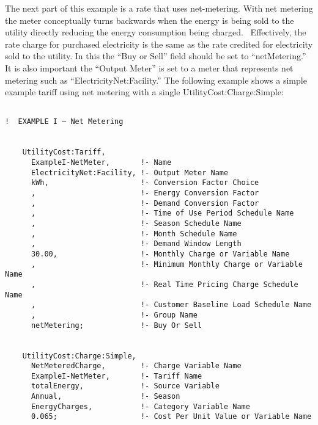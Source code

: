 The next part of this example is a rate that uses net-metering. With net metering the meter conceptually turns backwards when the energy is being sold to the utility directly reducing the energy consumption being charged.~ Effectively, the rate charge for purchased electricity is the same as the rate credited for electricity sold to the utility. In this the ``Buy or Sell'' field should be set to ``netMetering.''~ It is also important the ``Output Meter'' is set to a meter that represents net metering such as ``ElectricityNet:Facility.'' The following example shows a simple example tariff using net metering with a single UtilityCost:Charge:Simple:

\begin{lstlisting}

!  EXAMPLE I – Net Metering


    UtilityCost:Tariff,
      ExampleI-NetMeter,       !- Name
      ElectricityNet:Facility, !- Output Meter Name
      kWh,                     !- Conversion Factor Choice
      ,                        !- Energy Conversion Factor
      ,                        !- Demand Conversion Factor
      ,                        !- Time of Use Period Schedule Name
      ,                        !- Season Schedule Name
      ,                        !- Month Schedule Name
      ,                        !- Demand Window Length
      30.00,                   !- Monthly Charge or Variable Name
      ,                        !- Minimum Monthly Charge or Variable Name
      ,                        !- Real Time Pricing Charge Schedule Name
      ,                        !- Customer Baseline Load Schedule Name
      ,                        !- Group Name
      netMetering;             !- Buy Or Sell


    UtilityCost:Charge:Simple,
      NetMeteredCharge,        !- Charge Variable Name
      ExampleI-NetMeter,       !- Tariff Name
      totalEnergy,             !- Source Variable
      Annual,                  !- Season
      EnergyCharges,           !- Category Variable Name
      0.065;                   !- Cost Per Unit Value or Variable Name
\end{lstlisting}
